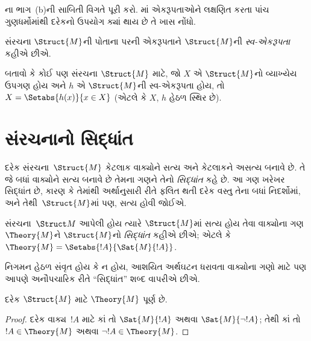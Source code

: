 \begin{prob}
ના ભાગ~(b)ની સાબિતી વિગતે પૂરી કરો.
માં એકરૂપતાઓને લક્ષણિત કરતા પાંચ
ગુણધર્મોમાંથી દરેકનો ઉપયોગ ક્યાં થાય છે તે ખાસ નોંધો.
\end{prob}

\begin{defn}
સંરચના $\Struct{M}$ની પોતાના પરની એકરૂપતાને $\Struct{M}$ની
\emph{સ્વ-એકરૂપતા} કહીએ છીએ.
\end{defn}

\begin{prob}
બતાવો કે કોઈ પણ સંરચના $\Struct{M}$ માટે, જો $X$ એ $\Struct{M}$નો
વ્યાખ્યેય ઉપગણ હોય અને $h$ એ $\Struct{M}$ની સ્વ-એકરૂપતા હોય, તો
$X = \Setabs{h(x)}{x \in X}$ (એટલે કે $X$, $h$ હેઠળ સ્થિર છે).
\end{prob}
\endgroup


\begingroup
\makeatletter{}\makeatother


\section{સંરચનાનો સિદ્ધાંત}
\label{guunit:OLP-0188}


દરેક સંરચના~$\Struct{M}$ કેટલાક વાક્યોને સત્ય અને
કેટલાકને અસત્ય બનાવે છે. તે જે બધાં વાક્યોને સત્ય બનાવે છે
તેમના ગણને તેનો \emph{સિદ્ધાંત} કહે છે. આ ગણ ખરેખર સિદ્ધાંત છે, કારણ કે
તેમાંથી અર્થાનુસારી રીતે ફલિત થતી દરેક વસ્તુ તેના બધાં નિદર્શોમાં,
અને તેથી~$\Struct{M}$માં પણ, સત્ય હોવી જોઈએ.

\begin{defn}
  સંરચના~$\Struct M$ આપેલી હોય ત્યારે $\Struct{M}$માં સત્ય
  હોય તેવા વાક્યોના ગણ $\Theory{M}$ને $\Struct{M}$નો
  \emph{સિદ્ધાંત} કહીએ છીએ; એટલે કે $\Theory{M} =
  \Setabs{!A}{\Sat{M}{!A}}$.
\end{defn}

નિગમન હેઠળ સંવૃત હોય કે ન હોય, આશયિત અર્થઘટન ધરાવતા
વાક્યોના ગણો માટે પણ આપણે અનૌપચારિક રીતે ``સિદ્ધાંત'' શબ્દ વાપરીએ છીએ.

\begin{prop}
દરેક $\Struct{M}$ માટે $\Theory{M}$ પૂર્ણ છે.
\end{prop}

\begin{proof}
દરેક વાક્ય~$!A$ માટે કાં તો $\Sat{M}{!A}$ અથવા
$\Sat{M}{\lnot !A}$; તેથી કાં તો $!A \in \Theory{M}$ અથવા
$\lnot !A \in \Theory{M}$.
\end{proof}


